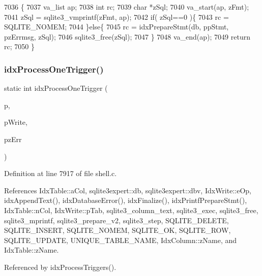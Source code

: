 \begin{DoxyCode}
7036  \{
7037   va\_list ap;
7038   \textcolor{keywordtype}{int} rc;
7039   \textcolor{keywordtype}{char} *zSql;
7040   va\_start(ap, zFmt);
7041   zSql = sqlite3_vmprintf(zFmt, ap);
7042   \textcolor{keywordflow}{if}( zSql==0 )\{
7043     rc = SQLITE_NOMEM;
7044   \}\textcolor{keywordflow}{else}\{
7045     rc = idxPrepareStmt(db, ppStmt, pzErrmsg, zSql);
7046     sqlite3_free(zSql);
7047   \}
7048   va\_end(ap);
7049   \textcolor{keywordflow}{return} rc;
7050 \}
\end{DoxyCode}
\mbox{\label{shell_8c_a3b2da0cb684b8584e24ea70ce081386a}} 
\subsubsection{idx\+Process\+One\+Trigger()}
{\footnotesize\ttfamily static int idx\+Process\+One\+Trigger (\begin{DoxyParamCaption}\item[{\textbf{ sqlite3expert} $\ast$}]{p,  }\item[{\textbf{ Idx\+Write} $\ast$}]{p\+Write,  }\item[{char $\ast$$\ast$}]{pz\+Err }\end{DoxyParamCaption})\hspace{0.3cm}{\ttfamily [static]}}



Definition at line 7917 of file shell.\+c.



References Idx\+Table\+::a\+Col, sqlite3expert\+::db, sqlite3expert\+::dbv, Idx\+Write\+::e\+Op, idx\+Append\+Text(), idx\+Database\+Error(), idx\+Finalize(), idx\+Printf\+Prepare\+Stmt(), Idx\+Table\+::n\+Col, Idx\+Write\+::p\+Tab, sqlite3\+\_\+column\+\_\+text, sqlite3\+\_\+exec, sqlite3\+\_\+free, sqlite3\+\_\+mprintf, sqlite3\+\_\+prepare\+\_\+v2, sqlite3\+\_\+step, S\+Q\+L\+I\+T\+E\+\_\+\+D\+E\+L\+E\+TE, S\+Q\+L\+I\+T\+E\+\_\+\+I\+N\+S\+E\+RT, S\+Q\+L\+I\+T\+E\+\_\+\+N\+O\+M\+EM, S\+Q\+L\+I\+T\+E\+\_\+\+OK, S\+Q\+L\+I\+T\+E\+\_\+\+R\+OW, S\+Q\+L\+I\+T\+E\+\_\+\+U\+P\+D\+A\+TE, U\+N\+I\+Q\+U\+E\+\_\+\+T\+A\+B\+L\+E\+\_\+\+N\+A\+ME, Idx\+Column\+::z\+Name, and Idx\+Table\+::z\+Name.



Referenced by idx\+Process\+Triggers().


